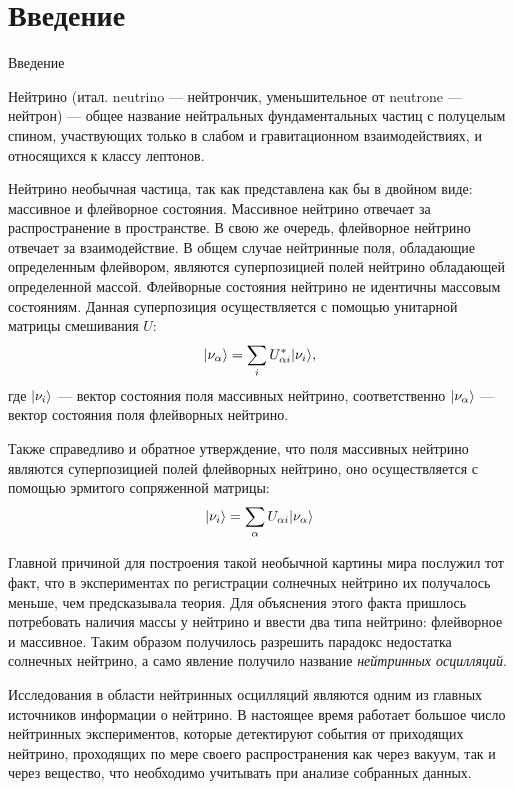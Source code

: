 \documentclass[a4paper,12pt]{article}
\DeclarePairedDelimiter\ket{|}{\rangle}
\begin{document}
\setcounter{page}{2}

\thispagestyle{empty}
\tableofcontents

\newpage

\section*{Введение}
{Введение}

Нейтрино (итал. neutrino — нейтрончик, уменьшительное от neutrone — нейтрон) —
общее название нейтральных фундаментальных частиц с полуцелым спином,
участвующих только в слабом и гравитационном взаимодействиях, и относящихся к
классу лептонов.

Нейтрино необычная частица, так как представлена как бы в двойном виде:
массивное и флейворное состояния. Массивное нейтрино отвечает за распространение
в пространстве. В свою же очередь, флейворное нейтрино отвечает за
взаимодействие. В общем случае нейтринные поля, обладающие определенным
флейвором, являются суперпозицией полей нейтрино обладающей определенной
массой. Флейворные состояния нейтрино не идентичны массовым состояниям. Данная
суперпозиция осуществляется с помощью унитарной матрицы смешивания \(U\):
\begin{equation*}
  \ket{\nu_{\alpha}}=\sum_{i}U_{\alpha i}^{*}\ket{\nu_{i}},
\end{equation*}
где \(\ket{\nu_{i}}\) — вектор состояния поля массивных нейтрино, соответственно
\(\ket{\nu_{\alpha}}\) — вектор состояния поля флейворных нейтрино.

Также справедливо и обратное утверждение, что поля массивных нейтрино являются
суперпозицией полей флейворных нейтрино, оно осуществляется с помощью
эрмитого сопряженной матрицы:
\begin{equation*}
  \ket{\nu_{i}}=\sum_{\alpha}U_{\alpha i}\ket{\nu_{\alpha}}
\end{equation*}

Главной причиной для построения такой необычной картины мира послужил тот факт,
что в экспериментах по регистрации солнечных нейтрино их получалось меньше, чем
предсказывала теория. Для объяснения этого факта пришлось потребовать наличия
массы у нейтрино и ввести два типа нейтрино: флейворное и массивное. Таким
образом получилось разрешить парадокс недостатка солнечных нейтрино, а само
явление получило название \textit{нейтринных осцилляций}.

Исследования в области нейтринных осцилляций являются одним из главных
источников информации о нейтрино. В настоящее время работает большое число
нейтринных экспериментов, которые детектируют события от приходящих нейтрино,
проходящих по мере своего распространения как через вакуум, так и через
вещество, что необходимо учитывать при анализе собранных данных.
\end{document}
